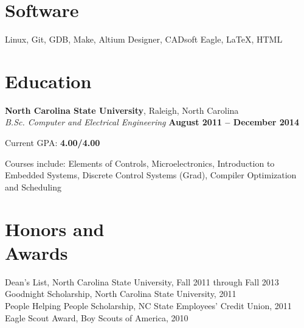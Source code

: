 \documentclass[margin,line,letterpaper]{resume}
\begin{document}
\begin{resume}
    \section{\mysidestyle Software}
    Linux, Git, GDB, Make, Altium Designer, CADsoft Eagle, \LaTeX, HTML

    \section{\mysidestyle Education}

    \textbf{North Carolina State University}, Raleigh, North Carolina \vspace{2mm}\\\vspace{1mm}%
    \textsl{B.Sc. Computer and Electrical Engineering} \hfill \textbf{August 2011 -- December 2014}\vspace{-3mm}\\\vspace{-1mm}%
    \begin{list2}
        \item Current GPA: \textbf{4.00/4.00}
        \item Courses include: Elements of Controls, Microelectronics, Introduction to Embedded Systems,
            Discrete Control Systems (Grad), Compiler Optimization and Scheduling
    \end{list2}\vspace{-1.5mm}


    \section{\mysidestyle Honors and\\Awards}

    Dean's List, North Carolina State University, Fall 2011 through Fall 2013   \vspace{-8mm}\\%

    Goodnight Scholarship, North Carolina State University, 2011              \vspace{-8mm}\\%

    People Helping People Scholarship, NC State Employees' Credit Union, 2011 \vspace{-8mm}\\%

    Eagle Scout Award, Boy Scouts of America, 2010


\end{resume}
\end{document}

